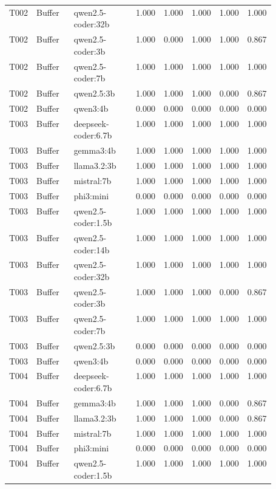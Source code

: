 \begin{longtable}{p{0.08\linewidth}p{0.16\linewidth}p{0.27\linewidth}rrrrr}
T002 & Buffer & qwen2.5-coder:32b & 1.000 & 1.000 & 1.000 & 1.000 & 1.000 \\
T002 & Buffer & qwen2.5-coder:3b & 1.000 & 0.000 & 1.000 & 1.000 & 0.867 \\
T002 & Buffer & qwen2.5-coder:7b & 1.000 & 1.000 & 1.000 & 1.000 & 1.000 \\
T002 & Buffer & qwen2.5:3b & 1.000 & 1.000 & 1.000 & 0.000 & 0.867 \\
T002 & Buffer & qwen3:4b & 0.000 & 0.000 & 0.000 & 0.000 & 0.000 \\
T003 & Buffer & deepseek-coder:6.7b & 1.000 & 1.000 & 1.000 & 1.000 & 1.000 \\
T003 & Buffer & gemma3:4b & 1.000 & 1.000 & 1.000 & 1.000 & 1.000 \\
T003 & Buffer & llama3.2:3b & 1.000 & 1.000 & 1.000 & 1.000 & 1.000 \\
T003 & Buffer & mistral:7b & 1.000 & 1.000 & 1.000 & 1.000 & 1.000 \\
T003 & Buffer & phi3:mini & 0.000 & 0.000 & 0.000 & 0.000 & 0.000 \\
T003 & Buffer & qwen2.5-coder:1.5b & 1.000 & 1.000 & 1.000 & 1.000 & 1.000 \\
T003 & Buffer & qwen2.5-coder:14b & 1.000 & 1.000 & 1.000 & 1.000 & 1.000 \\
T003 & Buffer & qwen2.5-coder:32b & 1.000 & 1.000 & 1.000 & 1.000 & 1.000 \\
T003 & Buffer & qwen2.5-coder:3b & 1.000 & 1.000 & 1.000 & 0.000 & 0.867 \\
T003 & Buffer & qwen2.5-coder:7b & 1.000 & 1.000 & 1.000 & 1.000 & 1.000 \\
T003 & Buffer & qwen2.5:3b & 0.000 & 0.000 & 0.000 & 0.000 & 0.000 \\
T003 & Buffer & qwen3:4b & 0.000 & 0.000 & 0.000 & 0.000 & 0.000 \\
T004 & Buffer & deepseek-coder:6.7b & 1.000 & 1.000 & 1.000 & 1.000 & 1.000 \\
T004 & Buffer & gemma3:4b & 1.000 & 1.000 & 1.000 & 0.000 & 0.867 \\
T004 & Buffer & llama3.2:3b & 1.000 & 1.000 & 1.000 & 0.000 & 0.867 \\
T004 & Buffer & mistral:7b & 1.000 & 1.000 & 1.000 & 1.000 & 1.000 \\
T004 & Buffer & phi3:mini & 0.000 & 0.000 & 0.000 & 0.000 & 0.000 \\
T004 & Buffer & qwen2.5-coder:1.5b & 1.000 & 1.000 & 1.000 & 1.000 & 1.000 \\

\end{longtable}
